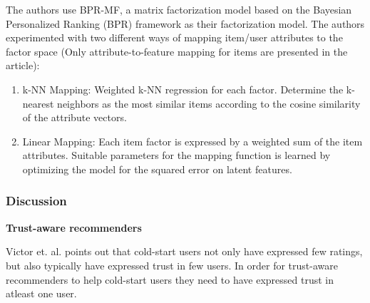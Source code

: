 The authors use BPR-MF, a matrix factorization model based on the Bayesian Personalized Ranking (BPR) framework as their factorization model. The authors experimented with two different ways of mapping item/user attributes to the factor space (Only attribute-to-feature mapping for items are presented in the article):

\begin{enumerate}
\item k-NN Mapping: Weighted k-NN regression for each factor. Determine the k-nearest neighbors as the most similar items according to the cosine similarity of the attribute vectors.
\item Linear Mapping: Each item factor is expressed by a weighted sum of the item attributes. Suitable parameters for the mapping function is learned by optimizing the model for the squared error on latent features.
\end{enumerate}

\subsubsection{Discussion}



\textbf{Trust-aware recommenders}

%

Victor et. al. \cite{Victor2008} points out that cold-start users not only have expressed few ratings, but also typically have expressed trust in few users. In order for trust-aware recommenders to help cold-start users they need to have expressed trust in atleast one user.


